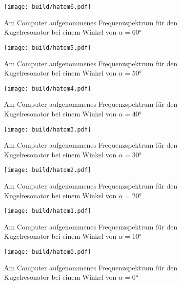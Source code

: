 \begin{figure}
  \centering
  \texttt{[image: build/hatom6.pdf]}
  \caption{Am Computer aufgenommenes Frequenzspektrum für den Kugelresonator bei
  einem Winkel von $\alpha=60°$}
  \label{fig:hatom6}
\end{figure}

\begin{figure}
  \centering
  \texttt{[image: build/hatom5.pdf]}
  \caption{Am Computer aufgenommenes Frequenzspektrum für den Kugelresonator bei
  einem Winkel von $\alpha=50°$}
  \label{fig:hatom5}
\end{figure}

\begin{figure}
  \centering
  \texttt{[image: build/hatom4.pdf]}
  \caption{Am Computer aufgenommenes Frequenzspektrum für den Kugelresonator bei
  einem Winkel von $\alpha=40°$}
  \label{fig:hatom4}
\end{figure}

\begin{figure}
  \centering
  \texttt{[image: build/hatom3.pdf]}
  \caption{Am Computer aufgenommenes Frequenzspektrum für den Kugelresonator bei
  einem Winkel von $\alpha=30°$}
  \label{fig:hatom3}
\end{figure}

\begin{figure}
  \centering
  \texttt{[image: build/hatom2.pdf]}
  \caption{Am Computer aufgenommenes Frequenzspektrum für den Kugelresonator bei
  einem Winkel von $\alpha=20°$}
  \label{fig:hatom2}
\end{figure}

\begin{figure}
  \centering
  \texttt{[image: build/hatom1.pdf]}
  \caption{Am Computer aufgenommenes Frequenzspektrum für den Kugelresonator bei
  einem Winkel von $\alpha=10°$}
  \label{fig:hatom1}
\end{figure}

\begin{figure}
  \centering
  \texttt{[image: build/hatom0.pdf]}
  \caption{Am Computer aufgenommenes Frequenzspektrum für den Kugelresonator bei
  einem Winkel von $\alpha=0°$}
  \label{fig:hatom0}
\end{figure}
